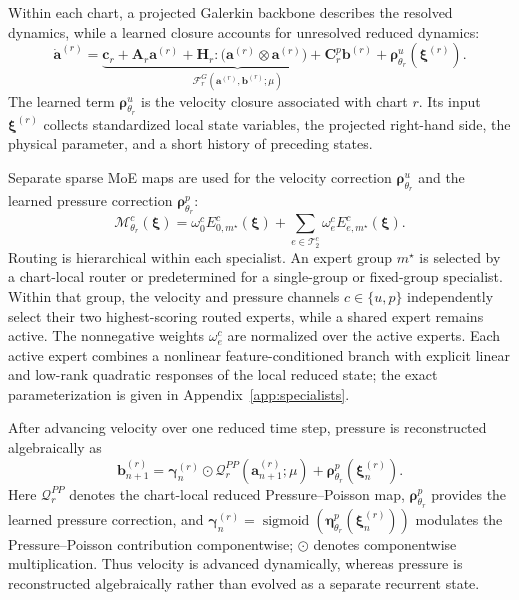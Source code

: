 Within each chart, a projected Galerkin backbone describes the resolved dynamics, while a learned closure accounts for unresolved reduced dynamics:
\begin{equation}
  \dot{\bm a}^{(r)}=
  \underbrace{\bm c_r+\bm A_r\bm a^{(r)}+
  \bm H_r:\bigl(\bm a^{(r)}\otimes\bm a^{(r)}\bigr)+
  \bm C^p_r\bm b^{(r)}}_{\mathcal F_r^{G}(\bm a^{(r)},\bm b^{(r)};\mu)}
  +\bm\rho^u_{\theta_r}(\bm\xi^{(r)}).
  \label{eq:main_specialist}
\end{equation}
The learned term $\bm\rho^u_{\theta_r}$ is the velocity closure associated with chart $r$. Its input $\bm\xi^{(r)}$ collects standardized local state variables, the projected right-hand side, the physical parameter, and a short history of preceding states.

Separate sparse MoE maps are used for the velocity correction $\bm\rho^u_{\theta_r}$ and the learned pressure correction $\bm\rho^p_{\theta_r}$:
\begin{equation}
  \mathcal M^c_{\theta_r}(\bm\xi)=
  \omega^c_0 E^c_{0,m^\star}(\bm\xi)+
  \sum_{e\in\mathcal T_2^c}\omega^c_e E^c_{e,m^\star}(\bm\xi).
  \label{eq:main_inner_moe}
\end{equation}
Routing is hierarchical within each specialist. An expert group $m^\star$ is selected by a chart-local router or predetermined for a single-group or fixed-group specialist. Within that group, the velocity and pressure channels $c\in\{u,p\}$ independently select their two highest-scoring routed experts, while a shared expert remains active. The nonnegative weights $\omega_e^c$ are normalized over the active experts. Each active expert combines a nonlinear feature-conditioned branch with explicit linear and low-rank quadratic responses of the local reduced state; the exact parameterization is given in Appendix~\ref{app:specialists}.

After advancing velocity over one reduced time step, pressure is reconstructed algebraically as
\begin{equation}
  \bm b_{n+1}^{(r)}
  =\bm\gamma_n^{(r)}\odot\mathcal Q_r^{PP}(\bm a_{n+1}^{(r)};\mu)
  +\bm\rho^p_{\theta_r}(\bm\xi_n^{(r)}).
  \label{eq:main_pressure_closure}
\end{equation}
Here $\mathcal Q_r^{PP}$ denotes the chart-local reduced Pressure--Poisson map, $\bm\rho^p_{\theta_r}$ provides the learned pressure correction, and $\bm\gamma_n^{(r)} =\operatorname{sigmoid}(\bm\eta^p_{\theta_r}(\bm\xi_n^{(r)}))$ modulates the Pressure--Poisson contribution componentwise; $\odot$ denotes componentwise multiplication. Thus velocity is advanced dynamically, whereas pressure is reconstructed algebraically rather than evolved as a separate recurrent state.



